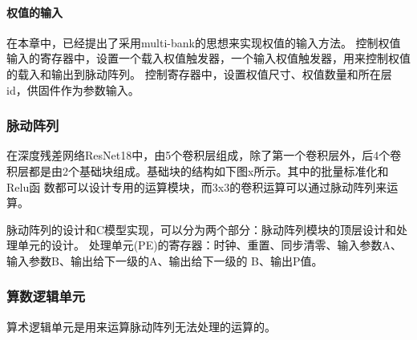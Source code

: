 \paragraph{权值的输入}
在本章中，已经提出了采用multi-bank的思想来实现权值的输入方法。
控制权值输入的寄存器中，设置一个载入权值触发器，一个输入权值触发器，用来控制权值的载入和输出到脉动阵列。
控制寄存器中，设置权值尺寸、权值数量和所在层id，供固件作为参数输入。


\subsubsection{脉动阵列}
在深度残差网络ResNet18中，由5个卷积层组成，除了第一个卷积层外，后4个卷积层都是由2个基础块组成。基础块的结构如下图x所示。其中的批量标准化和Relu函
数都可以设计专用的运算模块，而3x3的卷积运算可以通过脉动阵列来运算。 



  
脉动阵列的设计和C模型实现，可以分为两个部分：脉动阵列模块的顶层设计和处理单元的设计。
处理单元(PE)的寄存器：时钟、重置、同步清零、输入参数A、输入参数B、输出给下一级的A、输出给下一级的
B、输出P值。


\subsubsection{算数逻辑单元}
算术逻辑单元是用来运算脉动阵列无法处理的运算的。


